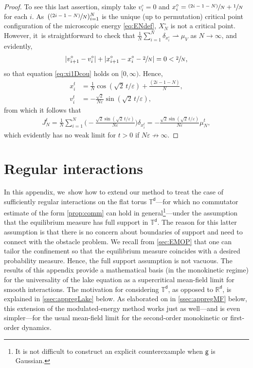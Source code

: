 \documentclass[JEP,XML,SOM,Unicode,published]{cedram}
\newcommand{\psfrac}[2]{\sfrac{(#1)}{#2}}
\theoremstyle{plain}
\theoremstyle{definition}
\newcommand{\R}{{\mathbb{R}}}
\newcommand{\T}{{\mathbb{T}}}
\let\vep\varepsilon
\newcommand{\XN}{X_N}
\renewcommand{\d}{\mathsf{d}}
\newcommand{\g}{{\mathsf{g}}}
\begin{document}
\begin{proof}
To see this last assertion, simply take $v_i^\circ = 0$ and $x_i^\circ = \psfrac{2i-1-N}{N} + \sfrac1N$ for each $i$. As~$(\psfrac{2i-1-N}{N})_{i=1}^N$ is the unique {(up to permutation)} critical point configuration of the microscopic energy \eqref{eq:ENdef}, $\XN^\circ$ is not a critical point. However, it~is straightforward to check that $\frac1N\sum_{i=1}^N\delta_{x_i^\circ} \rightharpoonup \mu_V$ as $N\to\infty$, and evidently,
\begin{align*}
|v_{i+1}^\circ-v_i^\circ| + |x_{i+1}^\circ-x_i^\circ-\sfrac2N| = 0 < \sfrac2N,
\end{align*}
so that equation \eqref{eq:xi1Dcou} holds on $[0,\infty)$. Hence,
\begin{align*}
x_i^t &= \frac1N\cos(\sqrt{2}\,t/\vep) + \frac{(2i-1-N)}{N}, \\
v_i^t &= -\frac{\sqrt{2}}{N\vep}\sin(\sqrt{2}\,t/\vep),
\end{align*}
from which it follows that
\begin{align*}
J_N^t = \frac1N\sum_{i=1}^N \Big(-\frac{\sqrt{2}\sin(\sqrt{2}\,t/\vep)}{N\vep}\Big)\delta_{x_i^t} = -\frac{\sqrt{2}\sin(\sqrt{2}\,t/\vep)}{N\vep}\mu_N^t,
\end{align*}
which evidently has no weak limit {for $t>0$} if $N\vep \not\to \infty$.
\end{proof}

\appendix
\section{Regular interactions}\label{sec:appreg}
In this appendix, we~show how to extend our method to treat the case of sufficiently regular interactions on the flat torus $\T^\d$---for which no commutator estimate of the form \cref{prop:comm} can hold in general\footnote{It is not difficult to construct an explicit counterexample when $\g$ is Gaussian.}---under the assumption that the equilibrium measure has full support in $\T^\d$. The reason for this latter assumption is that there is no concern about boundaries of support and need to connect with the obstacle problem. We recall from \cref{sec:EMOP} that one can tailor the confinement so that the equilibrium measure coincides with a desired probability measure. Hence, the full support assumption is not vacuous. The results of this appendix provide a mathematical basis (in the monokinetic regime) for the universality of the lake equation as a supercritical mean-field limit for smooth interactions. The motivation for considering $\T^\d$, as opposed to $\R^\d$, is explained in \cref{ssec:appregLake} below. {As elaborated on in \cref{ssec:appregMF} below, this extension of the modulated-energy method works just as well---and is even simpler---for the usual mean-field limit for the second-order monokinetic or first-order dynamics.}
\end{document}
